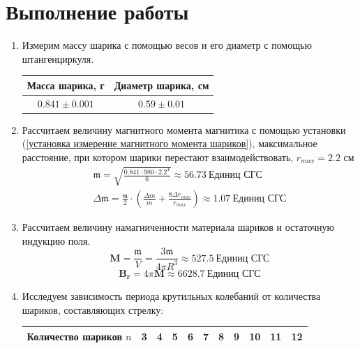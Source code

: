 \documentclass[a4paper, 12pt]{article}
\begin{document}
\section*{Выполнение работы}
\begin{enumerate}
    \item Измерим массу шарика с помощью весов и его диаметр с помощью штангенциркуля.
    \begin{table}[htbp]
        \centering
        \begin{tabular}{|c|c|}
            \hline
            Масса шарика, г & Диаметр шарика, см\\ \hline
            $0.841\pm 0.001$ & $0.59\pm 0.01$\\ \hline
        \end{tabular}
    \end{table}
    \item Рассчитаем величину магнитного момента магнитика с помощью установки (\ref{установка измерение магнитного момента шариков}), максимальное
    расстояние, при котором шарики перестают взаимодействовать, $r_{max} = 2.2$ см
    \begin{equation*}
        \begin{aligned}
            \mathfrak{m} = \sqrt{\frac{0.841\cdot 980\cdot 2.2^{4}}{6}} \approx 56.73\ \text{Единиц СГС}\\
            \Delta \mathfrak{m} = \frac{\mathfrak{m}}{2}\cdot \left(\frac{\Delta m}{m} + \frac{8\Delta r_{max}}{r_{max}}\right) \approx 1.07\ \text{Единиц СГС}
        \end{aligned}
    \end{equation*}
    \item Рассчитаем величину намагниченности материала шариков и остаточную индукцию поля.
    \begin{equation*}
        \mathbf{M} = \frac{\mathfrak{m}}{V} = \frac{3\mathfrak{m}}{4\pi R^{3}} \approx 527.5\ \text{Единиц СГС}
    \end{equation*}
    \begin{equation*}
        \mathbf{B_{r}} = 4\pi \mathbf{M} \approx 6628.7\ \text{Единиц СГС}
    \end{equation*}
    \item Исследуем зависимость периода крутильных колебаний от количества шариков, составляющих стрелку:
    \begin{table}[htbp]
        \centering
        \begin{tabular}{|c|c|c|c|c|c|c|c|c|c|c|}
            \hline
            Количество шариков $n$ & 3 & 4 & 5 & 6 & 7 & 8 & 9 & 10 & 11 & 12\\ \hline

\end{tabular}
\end{table}
\end{enumerate}
\end{document}
